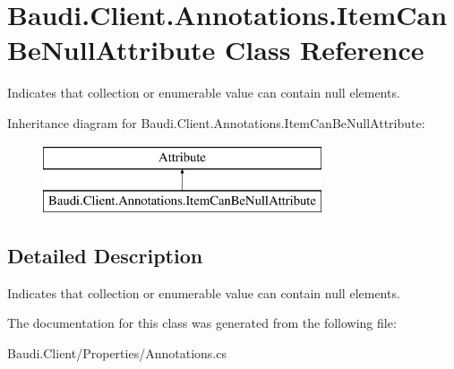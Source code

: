 \hypertarget{class_baudi_1_1_client_1_1_annotations_1_1_item_can_be_null_attribute}{}\section{Baudi.\+Client.\+Annotations.\+Item\+Can\+Be\+Null\+Attribute Class Reference}
\label{class_baudi_1_1_client_1_1_annotations_1_1_item_can_be_null_attribute}


Indicates that collection or enumerable value can contain null elements.  


Inheritance diagram for Baudi.\+Client.\+Annotations.\+Item\+Can\+Be\+Null\+Attribute\+:\begin{figure}[H]
\begin{center}
\leavevmode
\includegraphics[height=2.000000cm]{class_baudi_1_1_client_1_1_annotations_1_1_item_can_be_null_attribute}
\end{center}
\end{figure}


\subsection{Detailed Description}
Indicates that collection or enumerable value can contain null elements. 



The documentation for this class was generated from the following file\+:\begin{DoxyCompactItemize}
\item 
Baudi.\+Client/\+Properties/Annotations.\+cs\end{DoxyCompactItemize}
